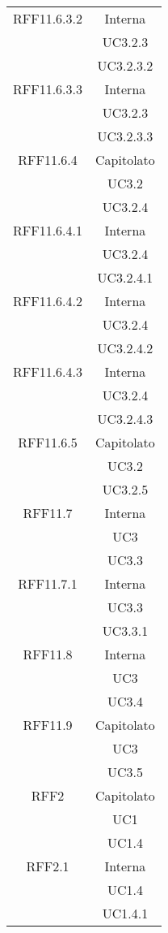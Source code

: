 \begin{longtable}{|c|c|}
\midrule
RFF11.6.3.2
& Interna\\
& UC3.2.3\\
& UC3.2.3.2\\

\midrule
RFF11.6.3.3
& Interna\\
& UC3.2.3\\
& UC3.2.3.3\\

\midrule
RFF11.6.4
& Capitolato\\
& UC3.2\\
& UC3.2.4\\

\midrule
RFF11.6.4.1
& Interna\\
& UC3.2.4\\
& UC3.2.4.1\\

\midrule
RFF11.6.4.2
& Interna\\
& UC3.2.4\\
& UC3.2.4.2\\

\midrule
RFF11.6.4.3
& Interna\\
& UC3.2.4\\
& UC3.2.4.3\\

\midrule
RFF11.6.5
& Capitolato\\
& UC3.2\\
& UC3.2.5\\

\midrule
RFF11.7
& Interna\\
& UC3\\
& UC3.3\\

\midrule
RFF11.7.1
& Interna\\
& UC3.3\\
& UC3.3.1\\

\midrule
RFF11.8
& Interna\\
& UC3\\
& UC3.4\\

\midrule
RFF11.9
& Capitolato\\
& UC3\\
& UC3.5\\

\midrule
RFF2
& Capitolato\\
& UC1\\
& UC1.4\\

\midrule
RFF2.1
& Interna\\
& UC1.4\\
& UC1.4.1\\


\end{longtable}
